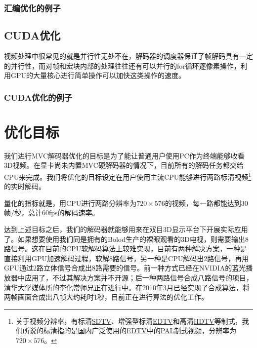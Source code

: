\subsubsection{汇编优化的例子}
\label{subsubsec:egasmopt}

\subsection{CUDA优化}
\label{subsec:cudaopt}

视频处理中很常见的就是并行性无处不在，解码器的调度器保证了帧解码具有一定的并行性，而对帧和宏块内部的处理往往还有可以并行的for循环逐像素操作，利用GPU的大量核心进行简单操作可以加快这类操作的速度。

\subsubsection{CUDA优化的例子}
\label{subsubsec:egcudaopt}

\section{优化目标}
\label{sec:optaim}

我们进行MVC解码器优化的目标是为了能让普通用户使用PC作为终端能够收看3D视频。在显卡尚未内置MVC硬解码器的情况下，目前所有的解码任务都交给CPU来完成。我们将优化的目标设定在用户使用主流CPU能够进行两路标清视频\footnote{关于视频分辨率，有标清\href{http://en.wikipedia.org/wiki/Standard-definition_television}{SDTV}、增强型标清\href{http://en.wikipedia.org/wiki/Enhanced-definition_television}{EDTV}和高清\href{http://en.wikipedia.org/wiki/High-definition_television}{HDTV}等制式，我们所说的标清指的是国内广泛使用的\href{http://en.wikipedia.org/wiki/Enhanced-definition_television}{EDTV}中的\href{http://en.wikipedia.org/wiki/Phase_Alternating_Line}{PAL}制式视频，分辨率为$720\times576$。}的实时解码。

量化的指标就是，用CPU进行两路分辨率为$720\times576$的视频，每一路都能达到30帧/秒，总计60fps的解码速率。

达到上述目标之后，我们的解码器就能够用来在双目3D显示平台下开展实际应用了。如果想要使用我们同是拥有的Bolod生产的裸眼观看的3D电视，则需要输出8路信号。这在目前的CPU软解码算法上较难实现，目前有两种解决方案，一种是直接利用GPU加速解码过程，软解8路信号，另一种是CPU解码出2路信号，再用GPU通过2路立体信号合成出8路需要的信号。前一种方式已经在NVIDIA的蓝光播放器中应用了，不过其解决方案并不开源；后一种两路信号合成八路信号的项目，清华大学媒体所的李化常师兄正在进行中。在2010年3月已经实现了合成算法，将两帧画面合成出八帧大约耗时1秒，目前正在进行算法的优化工作。